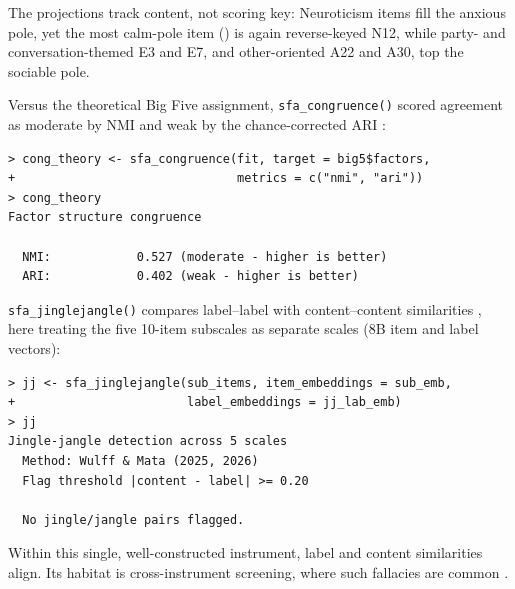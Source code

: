 The projections track content, not scoring key: Neuroticism items fill the
anxious pole, yet the most calm-pole item (\valProjNTwCalm) is again reverse-keyed
N12, while party- and conversation-themed E3 and E7, and other-oriented
A22 and A30, top the sociable pole.

Versus the theoretical Big Five assignment, \texttt{sfa\_congruence()}
scored agreement as moderate by NMI and weak by the chance-corrected ARI
\citep{hubert-arabie-1985}:

{\scriptsize
\begin{verbatim}
> cong_theory <- sfa_congruence(fit, target = big5$factors,
+                               metrics = c("nmi", "ari"))
> cong_theory
Factor structure congruence

  NMI:            0.527 (moderate - higher is better)
  ARI:            0.402 (weak - higher is better)
\end{verbatim}
}

\texttt{sfa\_jinglejangle()} compares label--label with content--content
similarities \citep{wulff-mata-2025, wulff-mata-2026}, here treating the
five 10-item subscales as separate scales (8B item and label vectors):

{\scriptsize
\begin{verbatim}
> jj <- sfa_jinglejangle(sub_items, item_embeddings = sub_emb,
+                        label_embeddings = jj_lab_emb)
> jj
Jingle-jangle detection across 5 scales
  Method: Wulff & Mata (2025, 2026)
  Flag threshold |content - label| >= 0.20

  No jingle/jangle pairs flagged.
\end{verbatim}
}

Within this single, well-constructed instrument, label and content
similarities align. Its habitat is cross-instrument screening, where such
fallacies are common \citep{wulff-mata-2025}.
